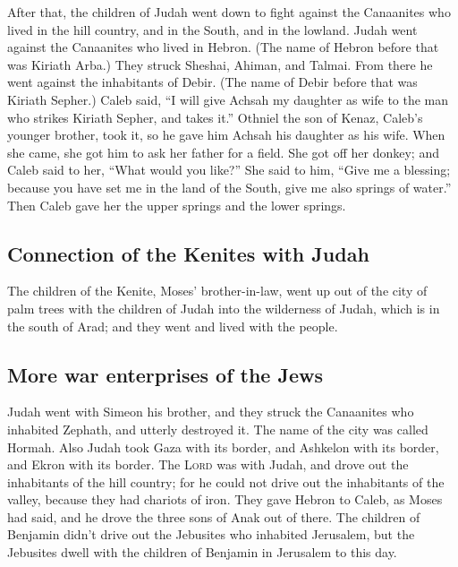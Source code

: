  After that, the children of Judah went down to fight
against the Canaanites who lived in the hill country, and in the South,
and in the lowland.  Judah went against the Canaanites
who lived in Hebron. (The name of Hebron before that was Kiriath Arba.)
They struck Sheshai, Ahiman, and Talmai.  From there he
went against the inhabitants of Debir. (The name of Debir before that
was Kiriath Sepher.)  Caleb said, ``I will give Achsah my
daughter as wife to the man who strikes Kiriath Sepher, and takes it.''
 Othniel the son of Kenaz, Caleb's younger brother, took
it, so he gave him Achsah his daughter as his wife.  When
she came, she got him to ask her father for a field. She got off her
donkey; and Caleb said to her, ``What would you like?'' 
She said to him, ``Give me a blessing; because you have set me in the
land of the South, give me also springs of water.'' Then Caleb gave her
the upper springs and the lower springs.

\hypertarget{connection-of-the-kenites-with-judah}{%
\subsection{Connection of the Kenites with
Judah}\label{connection-of-the-kenites-with-judah}}

 The children of the Kenite, Moses' brother-in-law, went
up out of the city of palm trees with the children of Judah into the
wilderness of Judah, which is in the south of Arad; and they went and
lived with the people.

\hypertarget{more-war-enterprises-of-the-jews}{%
\subsection{More war enterprises of the
Jews}\label{more-war-enterprises-of-the-jews}}

 Judah went with Simeon his brother, and they struck the
Canaanites who inhabited Zephath, and utterly destroyed it. The name of
the city was called Hormah.  Also Judah took Gaza with
its border, and Ashkelon with its border, and Ekron with its border.
 The \textsc{Lord} was with Judah, and drove out the
inhabitants of the hill country; for he could not drive out the
inhabitants of the valley, because they had chariots of iron.
 They gave Hebron to Caleb, as Moses had said, and he
drove the three sons of Anak out of there.  The children
of Benjamin didn't drive out the Jebusites who inhabited Jerusalem, but
the Jebusites dwell with the children of Benjamin in Jerusalem to this
day.


